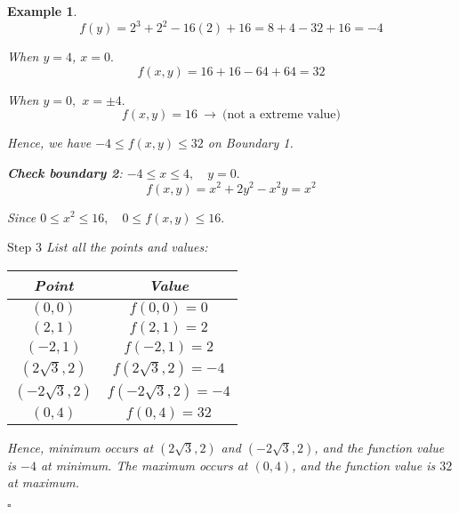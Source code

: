 \documentclass[12pt,a4paper]{article}
\newtheorem{eg}{Example}[subsection]
\newenvironment*{ans}{\par\indent{\textit{Answer. }}\par}{\par\hfill{$\square$}\par}
\begin{document}
\begin{eg}
\begin{ans}
\[f(y)=2^3+2^2-16(2)+16=8+4-32+16=-4\]\par\hspace{10mm} When $y=4$, $x=0.$\[f(x,y)=16+16-64+64=32\]\par\hspace{10mm} When $y=0,$ $x=\pm4.$ \[f(x,y)=16\ \rightarrow\ \text{(not a extreme value)}\]\par\hspace{10mm} Hence, we have $-4\leq f(x,y)\leq32$ on Boundary 1. \par\hspace{5mm}\textbf{Check boundary 2}: $-4\leq x\leq 4,\quad y=0.$ \[f(x,y)=x^2+2y^2-x^2y=x^2\]\par\hspace{10mm} Since $0\leq x^2\leq 16,\quad0\leq f(x,y)\leq16.$\par$\boxed{\text{Step }3}$ List all the points and values: \begin{center}\begin{tabular}{c|c}Point&Value\\\hline$(0,0)$&$f(0,0)=0$\\$(2,1)$&$f(2,1)=2$\\$(-2,1)$&$f(-2,1)=2$\\$(2\sqrt{3},2)$&$f(2\sqrt{3},2)=-4$\\$(-2\sqrt{3},2)$&$f(-2\sqrt{3},2)=-4$\\$(0,4)$&$f(0,4)=32$\\\end{tabular}\end{center}\par\hspace{10mm} Hence, minimum occurs at $(2\sqrt{3}, 2)$ and $(-2\sqrt{3},2)$, and the function value is $-4$ at minimum. The maximum occurs at $(0,4)$, and the function value is $32$ at maximum. 
	\end{ans}
\end{eg}
\end{document}
